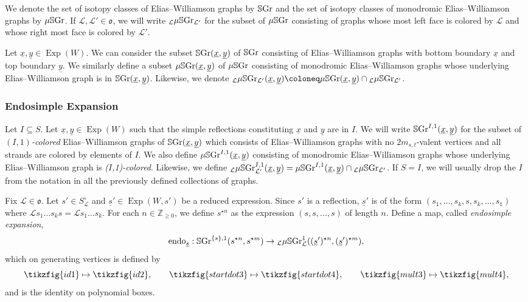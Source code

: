 \documentclass{amsart}
\newcommand{\Z}{\mathbb{Z}}
\newcommand{\scrL}{\mathcal{L}}
\newcommand{\fr}[1]{\mathfrak{#1}}
\DeclareMathOperator{\Exp}{Exp}
\newcommand{\SGraph}{\mathbb{S}\textnormal{Gr}}
\newcommand{\VSGraph}{\mu\mathbb{S}\textnormal{Gr}}
\newcommand{\ux}{\underline{x}}
\newcommand{\uy}{\underline{y}}
\newcommand{\us}{\underline{s}}
\theoremstyle{definition}
\numberwithin{equation}{subsection}
\begin{document}
We denote the set of isotopy classes of Elias--Williamson graphs by $\SGraph$ and the set of isotopy classes of monodromic Elias--Williamson graphs by $\VSGraph$.
If $\scrL, \scrL' \in \fr{o}$, we will write ${}_{\scrL} \VSGraph_{\scrL'}$ for the subset of $\VSGraph$ consisting of graphs whose most left face is colored by $\scrL$ and whose right most face is colored by $\scrL'$.

Let $\ux, \uy \in \Exp (W)$.
We can consider the subset $\SGraph (\ux, \uy)$ of $\SGraph$ consisting of Elias--Williamson graphs with bottom boundary $\ux$ and top boundary $\uy$.
We similarly define a subset $\VSGraph (\ux, \uy)$ of $\VSGraph$ consisting of monodromic Elias--Williamson graphs whose underlying Elias--Williamson graph is in $\SGraph (\ux, \uy)$.
Likewise, we denote ${}_{\scrL} \VSGraph_{\scrL'} (\ux, \uy) \coloneq \VSGraph (\ux, \uy) \cap {}_{\scrL} \VSGraph_{\scrL'}$.

\subsubsection{Endosimple Expansion}

Let $I \subseteq S$. Let $\ux, \uy \in \Exp (W)$ such that the simple reflections constituting $\ux$ and $\uy$ are in $I$. 
We will write $\SGraph^{I,1} (\ux, \uy)$ for the subset of \emph{$(I,1)$-colored} Elias--Williamson graphs of $\SGraph (\ux, \uy)$ which consists of Elias--Williamson graphs with no $2m_{s,t}$-valent vertices and all strands are colored by elements of $I$.
We also define $\VSGraph^{I,1} (\ux, \uy)$ consisting of monodromic Elias--Williamson graphs whose underlying Elias--Williamson graph is \emph{($I$,1)-colored}. Likewise, we define ${}_{\scrL} \VSGraph_{\scrL'}^{I,1} (\ux, \uy) = \VSGraph^{I,1} (\ux, \uy) \cap {}_{\scrL} \VSGraph_{\scrL'}$.
If $S=I$, we will usually drop the $I$ from the notation in all the previously defined collections of graphs.

Fix $\scrL \in \fr{o}$.
Let $s' \in S_{\scrL}^{\circ}$ and $\us' \in \Exp (W, s')$ be a reduced expression. Since $s'$ is a reflection, $\us'$ is of the form $(s_1, \ldots, s_k, s, s_k, \ldots, s_1)$ where $\scrL s_1 \ldots s_k s = \scrL s_1 \ldots s_k$.
For each $n \in \Z_{\geq 0}$, we define $s^{\star n}$ as the expression $(s,s,\ldots, s)$ of length $n$.
Define a map, called \emph{endosimple expansion}, 
\[\textnormal{endo}_{\us} : \SGraph^{\{s\}, 1} (s^{\star n}, s^{\star m}) \to {}_{\scrL} \VSGraph_{\scrL}^1 ((\us')^{\star n}, (\us')^{\star m}),\]
which on generating vertices is defined by
\[\tikzfig{id1} \mapsto \tikzfig{id2}, \qquad \tikzfig{startdot3} \mapsto \tikzfig{startdot4}, \qquad \tikzfig{mult3} \mapsto \tikzfig{mult4},\]
and is the identity on polynomial boxes.
\end{document}
